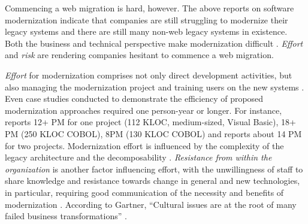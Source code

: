 Commencing a web migration is hard, however.
The above reports on software modernization indicate that companies are still struggling to modernize their legacy systems and there are still many non-web legacy systems in existence.
Both the business and technical perspective make modernization difficult \autocite{Khadka2014ProfessionalsModernization}.
\emph{Effort} and \emph{risk} \autocite{Khadka2014ProfessionalsModernization,Canfora2000Decomposing,Bisbal1999LegacyInformationSystems,Heil2018ReWaMP} are rendering companies hesitant to commence a web migration.

\emph{Effort} \autocite{ISO/IEEE24765Vocabulary} for modernization comprises not only direct development activities, but also managing the modernization project and training users on the new systems \autocite{ISO/IEEE2006SoftwareLifeCycle,Sneed2010SoftwareMigration,Seacord2003ModernizingLS}.
Even case studies conducted to demonstrate the efficiency of proposed modernization approaches required one person-year or longer.
For instance, \autocite{Distante2006} reports 12+ PM for one project (112 KLOC, medium-sized, Visual Basic), \autocite{Bernhart2012} 18+ PM (250 KLOC COBOL), \autocite{Aversano2001} 8PM (130 KLOC COBOL) and \autocite{Maenhaut2015} reports about 14 PM
for two projects.
Modernization effort is influenced by the complexity of the legacy architecture \autocite{Khadka2014ProfessionalsModernization} and the decomposability \autocite{Aversano2001,Lucia2006,Brodie1995Migrating}.
\emph{Resistance from within the organization} \autocite{Sneed2010ReMiP} is another factor influencing effort, with the unwillingness of staff to share knowledge and resistance towards change in general and new technologies, in particular, requiring good communication of the necessity and benefits of modernization \autocite{Khadka2014ProfessionalsModernization}.
According to Gartner, ``Cultural issues are at the root of many failed business transformations'' \autocite{Gartner2016Culture}.

